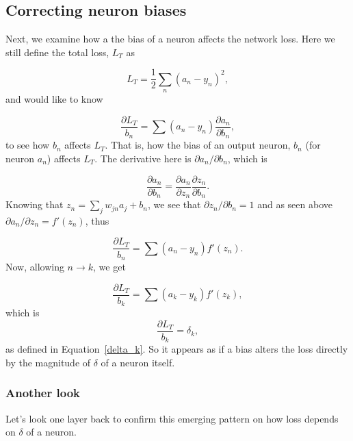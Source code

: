 \documentclass[12pt]{article}
\begin{document}
\subsection{Correcting neuron biases}

Next, we examine how a the bias of a neuron affects the network loss.  Here we still define the total loss, $L_T$ as

\begin{equation}
L_T=\frac{1}{2}\sum_n (a_n-y_n)^2,
\end{equation}
and would like to know

\begin{equation}
\frac{\partial L_T}{b_n}=\sum (a_n-y_n)\frac{\partial a_n}{\partial b_n},
\end{equation}
to see how $b_n$ affects $L_T$. That is, how the bias of an output neuron, $b_n$ (for neuron $a_n$) affects $L_T$. The derivative here is ${\partial a_n/\partial b_n}$, which is

\begin{equation}
\frac{\partial a_n}{\partial b_n}=\frac{\partial a_n}{\partial z_n}\frac{\partial z_n}{\partial b_n}.
\end{equation}
Knowing that $z_n=\sum_j w_{jn}a_j+b_n$, we see that ${\partial z_n}/{\partial b_n}=1$ and as seen above ${\partial a_n}/{\partial z_n}=f'(z_n)$, thus

\begin{equation}
\frac{\partial L_T}{b_n}=\sum (a_n-y_n)f'(z_n).
\end{equation}
Now, allowing $n\rightarrow k$, we get

\begin{equation}
\frac{\partial L_T}{b_k}=\sum (a_k-y_k)f'(z_k),
\end{equation}
which is
\begin{equation}
\frac{\partial L_T}{b_k}=\delta_k,
\end{equation}
as defined in Equation~\ref{delta_k}. So it appears as if a bias alters the loss directly by the magnitude of $\delta$ of a neuron itself. 

\subsubsection{Another look}
Let's look one layer back to confirm this emerging pattern on how loss depends on $\delta$ of a neuron.
\end{document}
